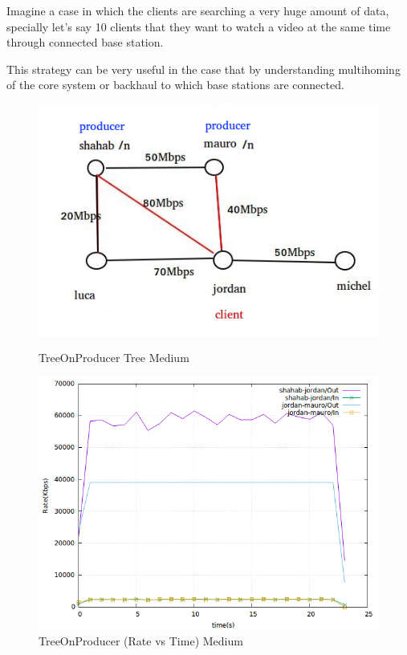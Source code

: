 Imagine a case in which the clients are searching a very huge amount of data, specially let's say 10 clients that they want to watch a video at the same time through connected base station.

This strategy can be very useful in the case that by understanding multihoming of the core system or backhaul to which base stations are connected.

\begin{figure}[H]

\begin{center}

\includegraphics[scale = 0.4]{Figures/TreeOnProducer.png}

\caption{TreeOnProducer Tree Medium} \label{TreeOnProducer} 


\includegraphics[scale = 0.4]{Figures/treeonproducer.png}

\caption{TreeOnProducer (Rate vs Time) Medium} \label{treeonproducer} 


\end{center}

\end{figure}

